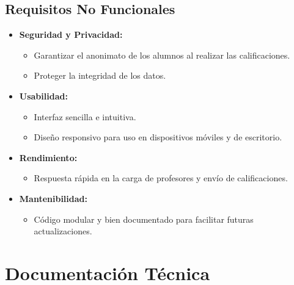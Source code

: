 \documentclass[11pt]{article}
\begin{document}
\subsection{Requisitos No Funcionales}
\begin{itemize}
    \item \textbf{Seguridad y Privacidad:}
    \begin{itemize}
        \item Garantizar el anonimato de los alumnos al realizar las calificaciones.
        \item Proteger la integridad de los datos.
    \end{itemize}
    \item \textbf{Usabilidad:}
    \begin{itemize}
        \item Interfaz sencilla e intuitiva.
        \item Diseño responsivo para uso en dispositivos móviles y de escritorio.
    \end{itemize}
    \item \textbf{Rendimiento:}
    \begin{itemize}
        \item Respuesta rápida en la carga de profesores y envío de calificaciones.
    \end{itemize}
    \item \textbf{Mantenibilidad:}
    \begin{itemize}
        \item Código modular y bien documentado para facilitar futuras actualizaciones.
    \end{itemize}
\end{itemize}

\newpage
\section{Documentación Técnica}
\end{document}
